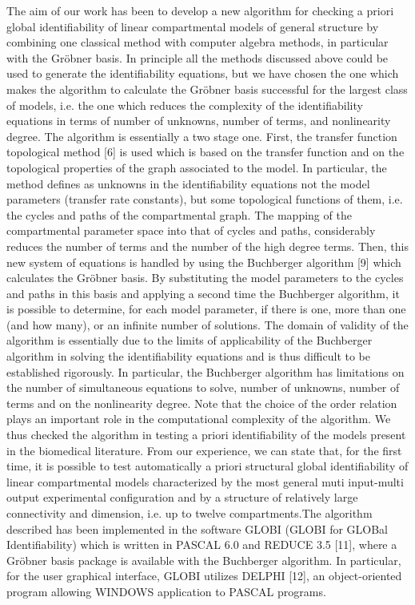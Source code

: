 The aim of our work has been to develop a new algorithm for checking a priori global
identifiability of linear compartmental models of general structure by combining one classical
method with computer algebra methods, in particular with the Gr\"obner basis. In principle all the
methods discussed above could be used to generate the identifiability equations, but we have
chosen the one which makes the algorithm to calculate the Gr\"obner basis successful for the largest
class of models, i.e. the one which reduces the complexity of the identifiability equations in terms
of number of unknowns, number of terms, and nonlinearity degree. The algorithm is essentially a
two stage one. First, the transfer function topological method [6] is used which is based on the
transfer function and on the topological properties of the graph associated to the model. In
particular, the method defines as unknowns in the identifiability equations not the model
parameters (transfer rate constants), but some topological functions of them, i.e. the cycles and
paths of the compartmental graph. The mapping of the compartmental parameter space into that of
cycles and paths, considerably reduces the number of terms and the number of the high degree
terms. Then, this new system of equations is handled by using the Buchberger algorithm [9] which
calculates the Gr\"obner basis. By substituting the model parameters to the cycles and paths in this
basis and applying a second time the Buchberger algorithm, it is possible to determine, for each
model parameter, if there is one, more than one (and how many), or an infinite number of
solutions. The domain of validity of the algorithm is essentially due to the limits of applicability
of the Buchberger algorithm in solving the identifiability equations and is thus difficult to be
established rigorously. In particular, the Buchberger algorithm has limitations on the number of
simultaneous equations to solve, number of unknowns, number of terms and on the nonlinearity
degree. Note that the choice of the order relation plays an important role in the computational
complexity of the algorithm. We thus checked the algorithm in testing a priori identifiability of
the models present in the biomedical literature. From our experience, we can state that, for the
first time, it is possible to test automatically a priori structural global identifiability of linear
compartmental models characterized by the most general muti input-multi output experimental
configuration and by a structure of relatively large connectivity and dimension, i.e. up to twelve
compartments.The algorithm described has been implemented in the software GLOBI (GLOBI for
GLOBal Identifiability) which is written in PASCAL 6.0 and REDUCE 3.5 [11], where a Gr\"obner
basis package is available with the Buchberger algorithm. In particular, for the user graphical
interface, GLOBI utilizes DELPHI [12], an object-oriented program allowing WINDOWS
application to PASCAL programs. \\

